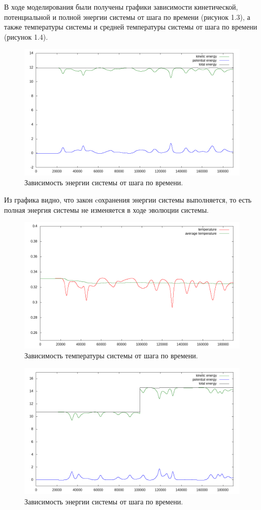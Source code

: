 \documentclass[14pt,a4paper,report]{ncc}
\begin{document}
В ходе моделирования были получены графики зависимости кинетической, потенциальной и полной энергии системы от шага по времени (рисунок 1.3), а также температуры системы и средней температуры системы от шага по времени (рисунок 1.4).
\

\begin{figure}[!h]
\includegraphics[scale=0.6]{plot_energy}
\caption{Зависимость энергии системы от шага по времени.}
\end{figure}
Из графика видно, что закон cохранения энергии системы выполняется, то есть полная энергия системы не изменяется в ходе эволюции системы.
\begin{figure}[!h]
\includegraphics[scale=0.6]{plot_temperature}
\caption{Зависимость температуры системы от шага по времени.}
\end{figure}

\begin{figure}[!h]
\includegraphics[scale=0.6]{plot_energy_control}
\caption{Зависимость энергии системы от шага по времени.}
\end{figure}
\end{document}
